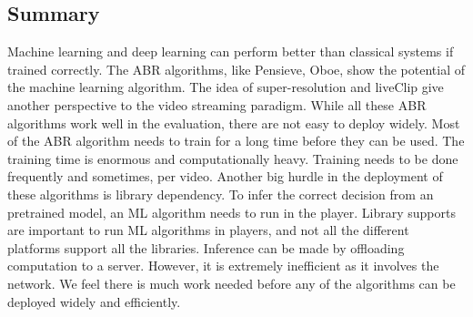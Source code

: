 \subsection{Summary}
Machine learning and deep learning can perform better than classical systems if trained correctly. The ABR algorithms, like Pensieve, Oboe, show the potential of the machine learning algorithm. The idea of super-resolution and liveClip give another perspective to the video streaming paradigm. While all these ABR algorithms work well in the evaluation, there are not easy to deploy widely. Most of the ABR algorithm needs to train for a long time before they can be used. The training time is enormous and computationally heavy. Training needs to be done frequently and sometimes, per video. Another big hurdle in the deployment of these algorithms is library dependency. To infer the correct decision from an pretrained model, an ML algorithm needs to run in the player. Library supports are important to run ML algorithms in players, and not all the different platforms support all the libraries. Inference can be made by offloading computation to a server. However, it is extremely inefficient as it involves the network. We feel there is much work needed before any of the algorithms can be deployed widely and efficiently.


